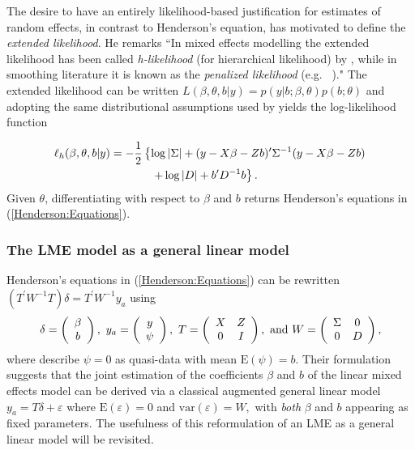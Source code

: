 \documentclass[12pt, a4paper]{report}
\theoremstyle{plain}
\theoremstyle{definition}
\theoremstyle{remark}
\begin{document}
			The desire to have an entirely likelihood-based justification for estimates of random effects, in contrast to Henderson's equation, has motivated \citet[page 429]{Pawi:in:2001} to define the \emph{extended likelihood}. He remarks ``In mixed effects modelling the extended likelihood has been called \emph{h-likelihood} (for hierarchical  likelihood) by \cite{Lee:Neld:hier:1996}, while in smoothing literature it is known as the \emph{penalized likelihood} (e.g.\ \citeauthor{Gree:Silv:nonp:1994} \citeyear{Gree:Silv:nonp:1994})." The extended likelihood can be written $L(\beta,\theta,b|y) = p(y|b;\beta,\theta) p(b;\theta)$ and adopting the same distributional assumptions used by \cite{Henderson:1950} yields the log-likelihood function
			
			\begin{eqnarray*}
				\ell_h(\beta,\theta,b|y)
				& = \displaystyle -\frac{1}{2} \left\{ \log|\Sigma| + (y - X \beta -Zb)'\Sigma^{-1}( y - X \beta -Zb) \right.\\
				&  \hspace{0.5in} \left. + \log|D| + b^\prime D^{-1}b \right\}.
			\end{eqnarray*}
			Given $\theta$, differentiating with respect to $\beta$ and $b$ returns Henderson's equations in (\ref{Henderson:Equations}).
			
			\subsubsection{The LME model as a general linear model}
			Henderson's equations in (\ref{Henderson:Equations}) can be rewritten $( T^\prime W^{-1} T ) \delta = T^\prime W^{-1} y_{a} $ using
			\[
			\delta = \left(\begin{array}{c}\beta \\ b \end{array}\right),
			\ y_{a} = \left(\begin{array}{c}
			y \cr \psi
			\end{array}\right),
			\ T = \left(\begin{array}{cc}
			X & Z  \\
			0 & I
			\end{array}\right),
			\ \textrm{and} \ W = \left(\begin{array}{cc}
			\Sigma & 0  \cr
			0 &  D \end{array}\right),
			\]
			where \cite{YLee2006} describe $\psi = 0$ as quasi-data with mean $\mathrm{E}(\psi) = b.$ Their formulation suggests that the joint estimation of the coefficients $\beta$ and $b$ of the linear mixed effects model can be derived via a classical augmented general linear model $y_{a} = T\delta + \varepsilon$ where $\mathrm{E}(\varepsilon) = 0$ and $\mathrm{var}(\varepsilon) = W,$ with \emph{both} $\beta$ and $b$ appearing as fixed parameters. The usefulness of this reformulation of an LME as a general linear model will be revisited.
			
\end{document}

